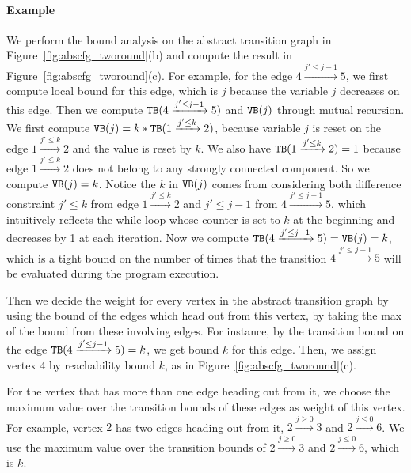 \paragraph{Example}
We perform the bound analysis on the abstract transition graph in Figure~\ref{fig:abscfg_tworound}(b) and compute the result in Figure~\ref{fig:abscfg_tworound}(c).
For example, for the edge 
$4 \xrightarrow{j' \leq j - 1} 5$, we first compute local bound for this edge, which is $j$
because the variable $j$ decreases on this edge.
Then we compute ${\mathtt{TB}}(4 \xrightarrow{j' \leq j - 1} 5)$ and ${\mathtt{VB}}(j)$ through mutual recursion.
We first compute ${\mathtt{VB}}(j) = k * {\mathtt{TB}}(1 \xrightarrow{j' \leq k} 2)$, 
because variable $j$ is reset on the edge $1 \xrightarrow{j' \leq k} 2$ and the value is reset by $k$.
We also have ${\mathtt{TB}}(1 \xrightarrow{j' \leq k} 2) = 1$ because edge $1 \xrightarrow{j' \leq k} 2$ does not belong to any strongly connected component.
So we compute ${\mathtt{VB}}(j) = k$.
Notice the $k$ in ${\mathtt{VB}}(j)$ comes from considering both difference constraint $j' \leq k$ from edge
$1 \xrightarrow{j' \leq k} 2$ and $j'\leq j - 1$ from $4 \xrightarrow{j' \leq j - 1} 5$, which intuitively reflects the while loop whose counter is set to $k$ at the beginning and decreases by 1 at each iteration. 
Now we compute ${\mathtt{TB}}(4 \xrightarrow{j' \leq j - 1} 5) = {\mathtt{VB}}(j) = k$,
which is a tight bound on the number of times that the transition $4 \xrightarrow{j' \leq j - 1} 5$ will be evaluated during the program execution.


Then we decide the weight for every vertex in the abstract transition graph by using the bound of the edges which head out from this vertex, by taking the max of the bound from these involving edges. 
For instance, 
by the transition bound on the edge ${\mathtt{TB}}(4 \xrightarrow{j' \leq j - 1} 5) = k$, we get bound $k$ for this edge.
Then, we assign vertex $4$ by reachability bound $k$, as in Figure~\ref{fig:abscfg_tworound}(c). 

For the vertex that has more than one edge heading out from it,
we choose the maximum value over the transition bounds of these edges as weight of this vertex.
For example, vertex $2$ has two edges heading out from it, $2 \xrightarrow{j \geq 0} 3$ and 
$2 \xrightarrow{j \leq 0} 6$. 
We use the maximum value over the transition bounds of $2 \xrightarrow{j \geq 0} 3$ and $2 \xrightarrow{j \leq 0} 6$,
which is $k$.

